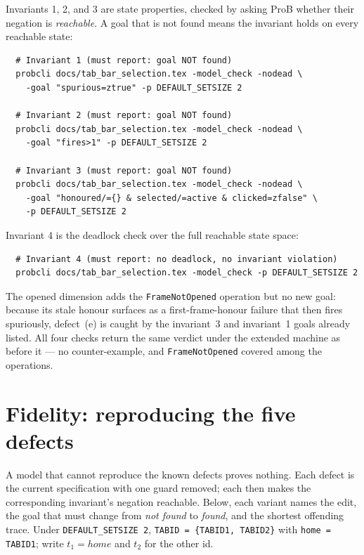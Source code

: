 \documentclass[a4paper,10pt,fleqn]{article}
\begin{document}
Invariants 1, 2, and 3 are state properties, checked by asking ProB whether
their negation is \emph{reachable}.  A goal that is not found means the
invariant holds on every reachable state:
\begin{verbatim}
  # Invariant 1 (must report: goal NOT found)
  probcli docs/tab_bar_selection.tex -model_check -nodead \
    -goal "spurious=ztrue" -p DEFAULT_SETSIZE 2

  # Invariant 2 (must report: goal NOT found)
  probcli docs/tab_bar_selection.tex -model_check -nodead \
    -goal "fires>1" -p DEFAULT_SETSIZE 2

  # Invariant 3 (must report: goal NOT found)
  probcli docs/tab_bar_selection.tex -model_check -nodead \
    -goal "honoured/={} & selected/=active & clicked=zfalse" \
    -p DEFAULT_SETSIZE 2
\end{verbatim}

Invariant 4 is the deadlock check over the full reachable state space:
\begin{verbatim}
  # Invariant 4 (must report: no deadlock, no invariant violation)
  probcli docs/tab_bar_selection.tex -model_check -p DEFAULT_SETSIZE 2
\end{verbatim}

The opened dimension adds the \texttt{FrameNotOpened} operation but no new goal:
because its stale honour surfaces as a first-frame-honour failure that then fires
spuriously, defect~(e) is caught by the invariant~3 and invariant~1 goals already
listed.  All four checks return the same verdict under the extended machine as
before it --- no counter-example, and \texttt{FrameNotOpened} covered among the
operations.

\section{Fidelity: reproducing the five defects}
\label{sec:fidelity}

A model that cannot reproduce the known defects proves nothing.  Each defect is
the current specification with one guard removed; each then makes the
corresponding invariant's negation reachable.  Below, each variant names the
edit, the goal that must change from \emph{not found} to \emph{found}, and the
shortest offending trace.  Under \texttt{DEFAULT\_SETSIZE 2},
\texttt{TABID = \{TABID1, TABID2\}} with \texttt{home = TABID1}; write
$t_1 = home$ and $t_2$ for the other id.
\end{document}
